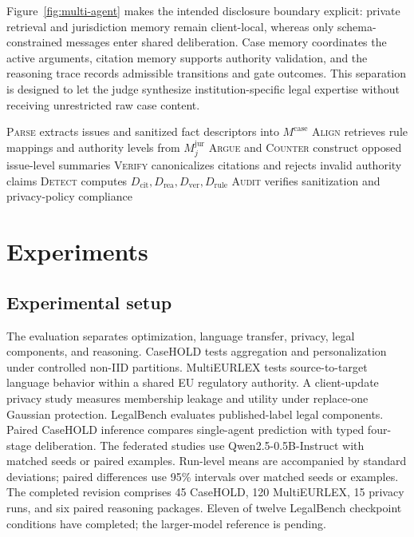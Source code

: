 \documentclass[a4paper,fleqn]{cas-sc}
\begin{document}
Figure~\ref{fig:multi-agent} makes the intended disclosure boundary explicit: private retrieval and jurisdiction memory remain client-local, whereas only schema-constrained messages enter shared deliberation. Case memory coordinates the active arguments, citation memory supports authority validation, and the reasoning trace records admissible transitions and gate outcomes. This separation is designed to let the judge synthesize institution-specific legal expertise without receiving unrestricted raw case content.

\begin{algorithm}[t]
\caption{Policy-gated data-local multi-agent judicial deliberation}
\label{alg:deliberation}
\DontPrintSemicolon
{}
\textsc{Parse} extracts issues and sanitized fact descriptors into $M^{\mathrm{case}}$\;
\textsc{Align} retrieves rule mappings and authority levels from $M^{\mathrm{jur}}_j$\;
\textsc{Argue} and \textsc{Counter} construct opposed issue-level summaries\;
\textsc{Verify} canonicalizes citations and rejects invalid authority claims\;
\textsc{Detect} computes $D_{\mathrm{cit}},D_{\mathrm{rea}},D_{\mathrm{ver}},D_{\mathrm{rule}}$\;
\textsc{Audit} verifies sanitization and privacy-policy compliance\;
\end{algorithm}

\FloatBarrier
\section{Experiments}
\label{sec:experiments}

\subsection{Experimental setup}

The evaluation separates optimization, language transfer, privacy, legal components, and reasoning. CaseHOLD tests aggregation and personalization under controlled non-IID partitions. MultiEURLEX tests source-to-target language behavior within a shared EU regulatory authority. A client-update privacy study measures membership leakage and utility under replace-one Gaussian protection. LegalBench evaluates published-label legal components. Paired CaseHOLD inference compares single-agent prediction with typed four-stage deliberation. The federated studies use Qwen2.5-0.5B-Instruct with matched seeds or paired examples. Run-level means are accompanied by standard deviations; paired differences use 95\% intervals over matched seeds or examples. The completed revision comprises 45 CaseHOLD, 120 MultiEURLEX, 15 privacy runs, and six paired reasoning packages. Eleven of twelve LegalBench checkpoint conditions have completed; the larger-model reference is pending.
\end{document}
